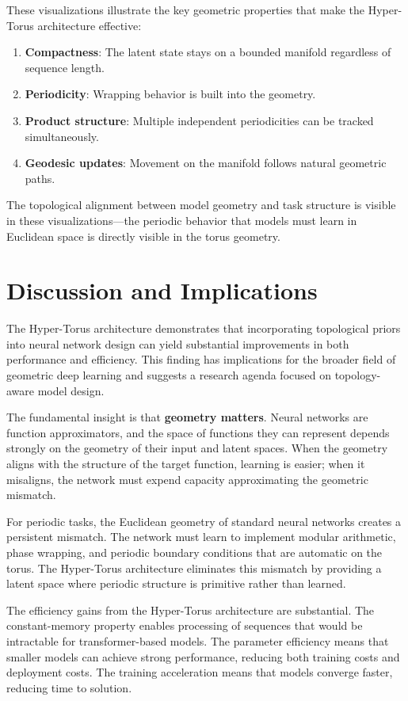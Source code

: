 \documentclass[12pt,letterpaper,twoside]{article}
\begin{document}
These visualizations illustrate the key geometric properties that make the Hyper-Torus architecture effective:
\begin{enumerate}
    \item \textbf{Compactness}: The latent state stays on a bounded manifold regardless of sequence length.
    \item \textbf{Periodicity}: Wrapping behavior is built into the geometry.
    \item \textbf{Product structure}: Multiple independent periodicities can be tracked simultaneously.
    \item \textbf{Geodesic updates}: Movement on the manifold follows natural geometric paths.
\end{enumerate}

The topological alignment between model geometry and task structure is visible in these visualizations—the periodic behavior that models must learn in Euclidean space is directly visible in the torus geometry.

\section{Discussion and Implications}
The Hyper-Torus architecture demonstrates that incorporating topological priors into neural network design can yield substantial improvements in both performance and efficiency. This finding has implications for the broader field of geometric deep learning and suggests a research agenda focused on topology-aware model design.

The fundamental insight is that \textbf{geometry matters}. Neural networks are function approximators, and the space of functions they can represent depends strongly on the geometry of their input and latent spaces. When the geometry aligns with the structure of the target function, learning is easier; when it misaligns, the network must expend capacity approximating the geometric mismatch.

For periodic tasks, the Euclidean geometry of standard neural networks creates a persistent mismatch. The network must learn to implement modular arithmetic, phase wrapping, and periodic boundary conditions that are automatic on the torus. The Hyper-Torus architecture eliminates this mismatch by providing a latent space where periodic structure is primitive rather than learned.

The efficiency gains from the Hyper-Torus architecture are substantial. The constant-memory property enables processing of sequences that would be intractable for transformer-based models. The parameter efficiency means that smaller models can achieve strong performance, reducing both training costs and deployment costs. The training acceleration means that models converge faster, reducing time to solution.
\end{document}
